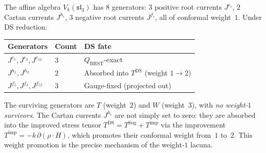 \begin{computation}
\label{comp:weight-1-elimination}
%
The affine algebra $V_k(\mathfrak{sl}_3)$ has $8$ generators:
$3$ positive root currents $J^{e_i}$, $2$ Cartan currents
$J^{h_i}$, $3$ negative root currents $J^{f_i}$, all of
conformal weight~$1$. Under DS reduction:

\begin{center}
\small
\renewcommand{\arraystretch}{1.3}
\begin{tabular}{lll}
\toprule
\textbf{Generators} & \textbf{Count}
 & \textbf{DS fate} \\
\midrule
$J^{e_1}, J^{e_2}, J^{e_{12}}$ & $3$ &
 $Q_{\mathrm{BRST}}$-exact \\
$J^{h_1}, J^{h_2}$ & $2$ &
 Absorbed into $T^{\mathrm{DS}}$ (weight $1 \to 2$) \\
$J^{f_1}, J^{f_2}, J^{f_{12}}$ & $3$ &
 Gauge-fixed (projected out) \\
\bottomrule
\end{tabular}
\end{center}

\noindent
The surviving generators are $T$ (weight~$2$) and $W$
(weight~$3$), with \emph{no weight-$1$ survivors}.
The Cartan currents $J^{h_i}$ are not simply set to zero:
they are absorbed into the improved stress tensor
$T^{\mathrm{DS}} = T^{\mathrm{Sug}} + T^{\mathrm{imp}}$
via the improvement $T^{\mathrm{imp}} = -k\,\partial(\rho
\cdot H)$, which promotes their conformal weight from~$1$
to~$2$. This weight promotion is the
precise mechanism of the weight-$1$ lacuna.
\end{computation}

